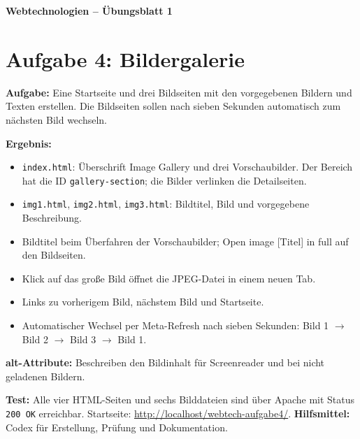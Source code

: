 \documentclass[11pt,a4paper]{article}
\begin{document}
\begin{center}
  {\Large\textbf{Webtechnologien -- Übungsblatt 1}}
\end{center}
\section*{Aufgabe 4: Bildergalerie}
\textbf{Aufgabe:} Eine Startseite und drei Bildseiten mit den
vorgegebenen Bildern und Texten erstellen. Die Bildseiten sollen nach
sieben Sekunden automatisch zum nächsten Bild wechseln.

\medskip
\textbf{Ergebnis:}
\begin{itemize}
  \item \texttt{index.html}: Überschrift \glqq Image Gallery\grqq{} und drei Vorschaubilder.
    Der Bereich hat die ID \texttt{gallery-section}; die Bilder verlinken die Detailseiten.
  \item \texttt{img1.html}, \texttt{img2.html}, \texttt{img3.html}:
    Bildtitel, Bild und vorgegebene Beschreibung.
  \item Bildtitel beim Überfahren der Vorschaubilder;
    \glqq Open image [Titel] in full\grqq{} auf den Bildseiten.
  \item Klick auf das große Bild öffnet die JPEG-Datei in einem neuen Tab.
  \item Links zu vorherigem Bild, nächstem Bild und Startseite.
  \item Automatischer Wechsel per Meta-Refresh nach sieben Sekunden:
    Bild 1 $\rightarrow$ Bild 2 $\rightarrow$ Bild 3 $\rightarrow$ Bild 1.
\end{itemize}
\textbf{alt-Attribute:} Beschreiben den Bildinhalt für Screenreader
und bei nicht geladenen Bildern.

\medskip
\textbf{Test:} Alle vier HTML-Seiten und sechs Bilddateien sind über
Apache mit Status \texttt{200 OK} erreichbar.
Startseite: \url{http://localhost/webtech-aufgabe4/}.
\medskip
{\small \textbf{Hilfsmittel:} Codex für Erstellung, Prüfung und Dokumentation.}
\end{document}
